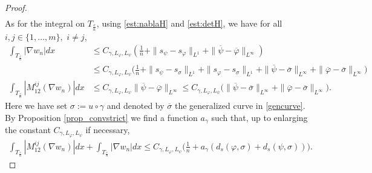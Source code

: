 \documentclass[10pt,a4paper]{amsart}
\def\det{\,{\rm det\ }}
\begin{document}
\begin{proof}
\begin{align}
\end{align}
	As for the integral on  $T_{\frac cn}$, using \eqref{est:nablaH} and \eqref{est:detH},  we have for all $i,j\in \{1,\dots,m\},$ $i\neq j$,
	\begin{align}\label{261}
		\int_{T_{\frac{c}{n}}}|\nabla w_{n}|dx&\leq C_{\gamma,L_\varphi,L_\psi}(\frac{1}{n}+\|s_{\psi}-s_{\varphi}\|_{L^1}+\|{\overline \psi}-{\overline \varphi}\|_{L^\infty})\nonumber\\
		&\leq C_{\gamma,L_\varphi,L_\psi}\big(\frac1n+\|s_{\psi}-s_{\sigma}\|_{L^1}+\|s_{\varphi}-s_\sigma\|_{L^1}+\|{\overline \psi}-{\overline\sigma}\|_{L^\infty}+\|{\overline \varphi}-{\overline\sigma}\|_{L^\infty}\big)\nonumber\\
		\int_{T_{\frac{c}{n}}}|M_{12}^{ij}(\nabla w_{n})|dx&\leq C_{\gamma,L_\varphi,L_\psi}\|{\overline \psi}-{\overline \varphi}\|_{L^\infty}\leq C_{\gamma,L_\varphi,L_\psi}\big(\|{\overline \psi}-{\overline \sigma}\|_{L^\infty}+\|{\overline \varphi}-{\overline \sigma}\|_{L^\infty}\big).
	\end{align}
	Here we have set $\sigma:=u\circ \gamma$ and denoted by $\overline \sigma$ the generalized curve in \eqref{gencurve}. By Proposition \ref{prop_convstrict} we find a function $a_\gamma$ such that, up to enlarging the constant $C_{\gamma,L_\varphi,L_\psi}$ if necessary, 
	\begin{align}\label{265}
		\int_{T_{\frac{c}{n}}}|M_{12}^{ij}(\nabla w_{n})|dx+\int_{T_{\frac{c}{n}}}|\nabla w_{n}|dx\leq C_{\gamma,L_\varphi,L_\psi}\big(\frac{1}{n}+a_\gamma(d_s(\varphi,\sigma)+d_s(\psi,\sigma))\big).

\end{align}
\end{proof}
\end{document}
